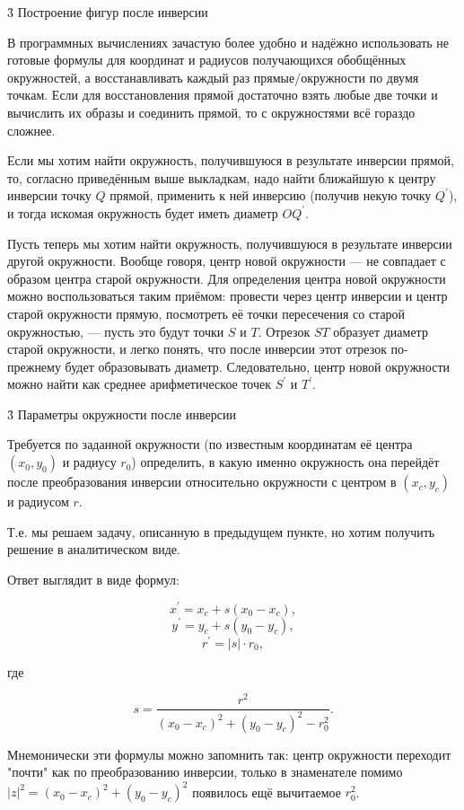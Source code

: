 \h3{ Построение фигур после инверсии }

В программных вычислениях зачастую более удобно и надёжно использовать не готовые формулы для координат и радиусов получающихся обобщённых окружностей, а восстанавливать каждый раз прямые/окружности по двумя точкам. Если для восстановления прямой достаточно взять любые две точки и вычислить их образы и соединить прямой, то с окружностями всё гораздо сложнее.

Если мы хотим найти окружность, получившуюся в результате инверсии прямой, то, согласно приведённым выше выкладкам, надо найти ближайшую к центру инверсии точку $Q$ прямой, применить к ней инверсию (получив некую точку $Q^\prime$), и тогда искомая окружность будет иметь диаметр $O Q^\prime$.

Пусть теперь мы хотим найти окружность, получившуюся в результате инверсии другой окружности. Вообще говоря, центр новой окружности --- не совпадает с образом центра старой окружности. Для определения центра новой окружности можно воспользоваться таким приёмом: провести через центр инверсии и центр старой окружности прямую, посмотреть её точки пересечения со старой окружностью, --- пусть это будут точки $S$ и $T$. Отрезок $ST$ образует диаметр старой окружности, и легко понять, что после инверсии этот отрезок по-прежнему будет образовывать диаметр. Следовательно, центр новой окружности можно найти как среднее арифметическое точек $S^\prime$ и $T^\prime$.


\h3{ Параметры окружности после инверсии }

Требуется по заданной окружности (по известным координатам её центра $(x_0,y_0)$ и радиусу $r_0$) определить, в какую именно окружность она перейдёт после преобразования инверсии относительно окружности с центром в $(x_c,y_c)$ и радиусом $r$.

Т.е. мы решаем задачу, описанную в предыдущем пункте, но хотим получить решение в аналитическом виде.

Ответ выглядит в виде формул:

$$ x^\prime = x_c + s (x_0 - x_c), $$
$$ y^\prime = y_c + s (y_0 - y_c), $$
$$ r^\prime = |s| \cdot r_0, $$

где

$$ s = \frac{ r^2 }{ (x_0 - x_c)^2 + (y_0 - y_c)^2 - r_0^2 }. $$

Мнемонически эти формулы можно запомнить так: центр окружности переходит "почти" как по преобразованию инверсии, только в знаменателе помимо $|z|^2 = (x_0 - x_c)^2 + (y_0 - y_c)^2$ появилось ещё вычитаемое $r_0^2$.

